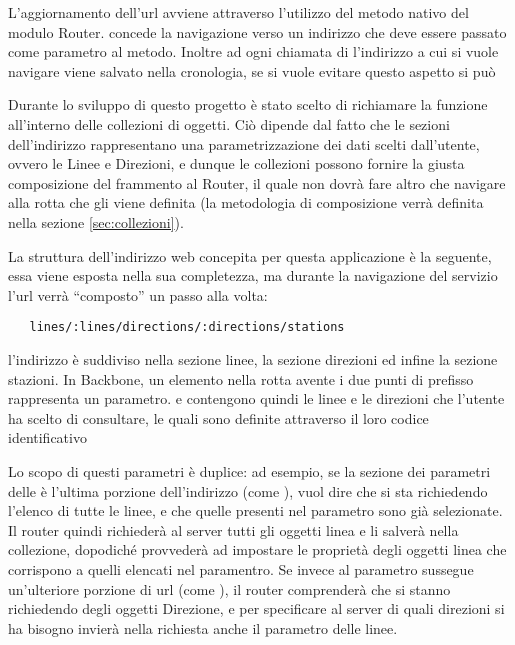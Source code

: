 L'aggiornamento dell'url avviene attraverso l'utilizzo del metodo nativo  del modulo Router.  concede la navigazione verso un indirizzo che deve essere passato come parametro al metodo. Inoltre ad ogni chiamata di  l'indirizzo a cui si vuole navigare viene salvato nella cronologia, se si vuole evitare questo aspetto si può 

Durante lo sviluppo di questo progetto è stato scelto di richiamare la funzione  all'interno delle collezioni di oggetti. Ciò dipende dal fatto che le sezioni dell'indirizzo rappresentano una parametrizzazione dei dati scelti dall'utente, ovvero le Linee e Direzioni, e dunque le collezioni possono fornire la giusta composizione del frammento al Router, il quale non dovrà fare altro che navigare alla rotta che gli viene definita (la metodologia di composizione verrà definita nella sezione \ref{sec:collezioni}).
\newpage

La struttura dell'indirizzo web concepita per questa applicazione è la seguente, essa viene esposta nella sua completezza, ma durante la navigazione del servizio l'url verrà ``composto'' un passo alla volta:

\begin{lstlisting}
   lines/:lines/directions/:directions/stations
\end{lstlisting}

l'indirizzo è suddiviso nella sezione linee, la sezione direzioni ed infine la sezione stazioni. In Backbone, un elemento nella rotta avente i  due punti di prefisso rappresenta un parametro.  e  contengono quindi le linee e le direzioni che l'utente ha scelto di consultare, le quali sono definite attraverso il loro codice identificativo

Lo scopo di questi parametri è duplice: ad esempio, se la sezione dei parametri delle è l'ultima porzione dell'indirizzo (come ), vuol dire che si sta richiedendo l'elenco di tutte le linee, e che quelle presenti nel parametro sono già selezionate. Il router quindi richiederà al server tutti gli oggetti linea e li salverà nella collezione, dopodiché provvederà ad impostare le proprietà  degli oggetti linea che corrispono a quelli elencati nel paramentro.
Se invece al parametro sussegue un'ulteriore porzione di url (come ), il router comprenderà che si stanno richiedendo degli oggetti Direzione, e per specificare al server di quali direzioni si ha bisogno invierà nella richiesta anche il parametro delle linee.

